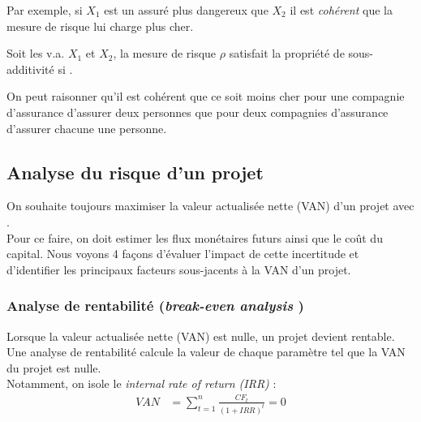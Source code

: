 \documentclass[10pt, french]{article}
\begin{document}
\begin{multicols*}{2}
\begin{definitionNOHFILLsub}[Monotonicité]
\begin{rappel_enhanced}[Interprétation]
Par exemple, si $X_{1}$ est un assuré plus dangereux que $X_{2}$ il est \textit{cohérent} que la mesure de risque lui charge plus cher.
\end{rappel_enhanced}
\end{definitionNOHFILLsub}

\begin{definitionNOHFILLsub}
Soit les v.a. $X_{1}$ et $X_{2}$, la mesure de risque $\rho$ satisfait la propriété de sous-additivité si .\\

\begin{rappel_enhanced}[Interprétation]
On peut raisonner qu'il est cohérent que ce soit moins cher pour une compagnie d'assurance d’assurer deux personnes que pour deux compagnies d'assurance d’assurer chacune une personne.
\end{rappel_enhanced}
\end{definitionNOHFILLsub}


\columnbreak
\subsection{Analyse du risque d'un projet}

On souhaite toujours maximiser la valeur actualisée nette (VAN) d'un projet avec .\\
Pour ce faire, on doit estimer les flux monétaires futurs ainsi que le coût du capital. Nous voyons 4 façons d'évaluer l'impact de cette incertitude et d'identifier les principaux facteurs sous-jacents à la VAN d'un projet.


\subsubsection{Analyse de rentabilité (\og \textit{break-even analysis} \fg{})}
Lorsque la valeur actualisée nette (VAN) est nulle, un projet devient rentable.\\
Une analyse de rentabilité calcule la valeur de chaque paramètre tel que la VAN du projet est nulle. \\

Notamment, on isole le \og \textit{internal rate of return (IRR)} \fg{}:
\begin{align*}
	VAN
	&=	\sum_{t	=	1}^{n}\frac{CF_{t}}{(1	+	IRR)^{t}}
	=	0
\end{align*}


\end{multicols*}
\end{document}
